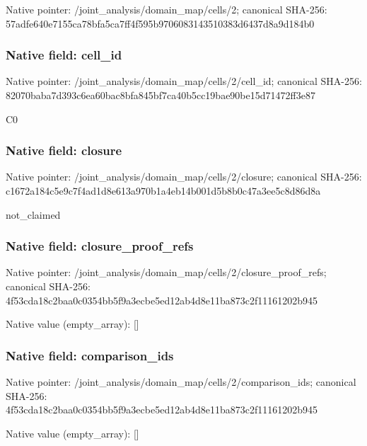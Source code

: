 \documentclass[10pt,a4paper]{article}
\begin{document}
Native pointer: /joint\_analysis/domain\_map/cells/2; canonical SHA-256: 57adfe640e7155ca78bfa5ca\allowbreak{}7ff4f595b970608314351038\allowbreak{}3d6437d8a9d184b0



\subsubsection{Native field: cell\_id}


Native pointer: /joint\_analysis/domain\_m\allowbreak{}ap/cells/2/cell\_id; canonical SHA-256: 82070baba7d393c6ea60bac8\allowbreak{}bfa845bf7ca40b5cc19bae90\allowbreak{}be15d71472ff3e87


C0


\subsubsection{Native field: closure}


Native pointer: /joint\_analysis/domain\_m\allowbreak{}ap/cells/2/closure; canonical SHA-256: c1672a184c5e9c7f4ad1d8e6\allowbreak{}13a970b1a4eb14b001d5b8b0\allowbreak{}c47a3ee5c8d86d8a


not\_claimed


\subsubsection{Native field: closure\_proof\_refs}


Native pointer: /joint\_analysis/domain\_m\allowbreak{}ap/cells/2/closure\_proof\allowbreak{}\_refs; canonical SHA-256: 4f53cda18c2baa0c0354bb5f\allowbreak{}9a3ecbe5ed12ab4d8e11ba87\allowbreak{}3c2f11161202b945



Native value (empty\_array): []



\subsubsection{Native field: comparison\_ids}


Native pointer: /joint\_analysis/domain\_m\allowbreak{}ap/cells/2/comparison\_id\allowbreak{}s; canonical SHA-256: 4f53cda18c2baa0c0354bb5f\allowbreak{}9a3ecbe5ed12ab4d8e11ba87\allowbreak{}3c2f11161202b945



Native value (empty\_array): []
\end{document}
